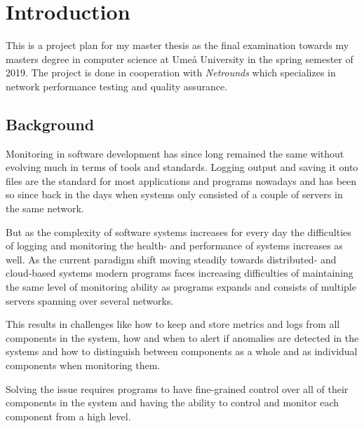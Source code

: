 \documentclass[10pt, titlepage, oneside, a4paper]{article}
\begin{document}
	\newpage

	
	\setlength{\parindent}{0pt}
	\setlength{\parskip}{10pt}
	
\tableofcontents
\newpage

\section{Introduction}

This is a project plan for my master thesis as the final examination towards my masters degree in computer science at Umeå University in the spring semester of 2019. The project is done in cooperation with \textit{Netrounds} which specializes in network performance testing and quality assurance. 


\subsection{Background}

Monitoring in software development has since long remained the same without evolving much in terms of tools and standards. Logging output and saving it onto files are the standard for most applications and programs nowadays and has been so since back in the days when systems only consisted of a couple of servers in the same network.

But as the complexity of software systems increases for every day the difficulties of logging and monitoring the health- and performance of systems increases as well. As the current paradigm shift moving steadily towards distributed- and cloud-based systems modern programs faces increasing difficulties of maintaining the same level of monitoring ability as programs expands and consists of multiple servers spanning over several networks.

This results in challenges like how to keep and store metrics and logs from all components in the system, how and when to alert if anomalies are detected in the systems and how to distinguish between components as a whole and as individual components when monitoring them.

Solving the issue requires programs to have fine-grained control over all of their components in the system and having the ability to control and monitor each component from a high level.  
\end{document}
